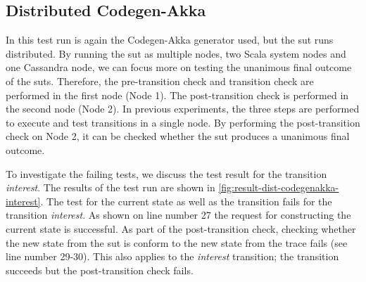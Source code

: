 
\subsection{Distributed Codegen-Akka}\label{sec:bug-dist-nodes}
In this test run is again the Codegen-Akka generator used, but the \gls{sut}
runs distributed. By running the \gls{sut} as multiple nodes, two Scala system
nodes and one Cassandra node, we can focus more on testing the unanimous final
outcome of the \gls{sut}s. Therefore, the pre-transition check and transition
check are performed in the first node (Node 1). The post-transition check is
performed in the second node (Node 2). In previous experiments, the three steps
are performed to execute and test transitions in a single node. By performing
the post-transition check on Node 2, it can be checked whether the
\gls{sut} produces a unanimous final outcome.

To investigate the failing tests, we discuss the test result for the transition
\textit{interest}. The results of the test run are shown in
\autoref{fig:result-dist-codegenakka-interest}. The test for the current state
as well as the transition fails for the transition \textit{interest}.
As shown on line number 27 the request for constructing the current state is
successful. As part of the post-transition check, checking whether the new state
from the \gls{sut} is conform to the new state from the trace fails
(see line number 29-30). This also applies to the \textit{interest} transition;
the transition succeeds but the post-transition check fails.

